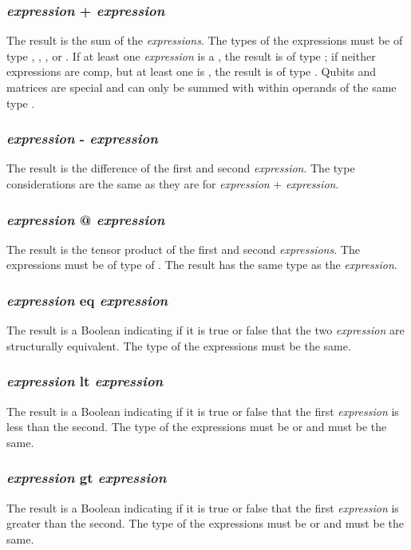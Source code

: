 \subsubsection{\textit{expression} + \textit{expression}}
The result is the sum of the \textit{expressions}. The types of the expressions must be of type \integ, \float, \complex, \new{\mat} or \qubit. If at least one \textit{expression} is a \complex, the result is of type \complex; if neither expressions are comp, but at least one is \float, the result is of type \float. Qubits and matrices are special and can only be summed with within operands of the same type .
\subsubsection{\textit{expression} - \textit{expression}}
The result is the difference of the first and second \textit{expression}. The type considerations are the same as they are for \textit{expression} + \textit{expression}.
\subsubsection{\textit{expression} @ \textit{expression}}
The result is the tensor product of the first and second \textit{expressions}. The expressions must be of type of \mat. The result has the same type as the \textit{expression}.
\subsubsection{\textit{expression} eq \textit{expression}}
The result is a Boolean indicating if it is true or false that the two \textit{expression} are structurally equivalent. The type of the expressions must be the same.
\subsubsection{\textit{expression} lt \textit{expression}}
The result is a Boolean indicating if it is true or false that the first \textit{expression} is less than the second. The type of the expressions must be \integ or \float and must be the same. 
\subsubsection{\textit{expression} gt \textit{expression}}
The result is a Boolean indicating if it is true or false that the first \textit{expression} is greater than the second. The type of the expressions must be \integ or \float and must be the same. 
